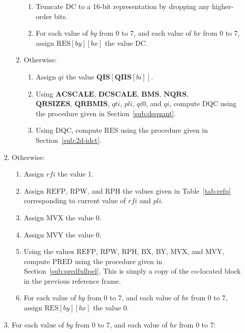 \documentclass[9pt,letterpaper]{book}
\newcommand{\idx}[1]{{\ensuremath{\mathit{#1}}}}
\newcommand{\qti}{\idx{qti}}
\newcommand{\pli}{\idx{pli}}
\newcommand{\qi}{\idx{qi}}
\newcommand{\bi}{\idx{bi}}
\newcommand{\rfi}{\idx{rfi}}
\newcommand{\bitvar}[1]{\ensuremath{\mathbf{\bm{#1}}}}
\newcommand{\locvar}[1]{\ensuremath{\mathrm{#1}}}
\numberwithin{equation}{chapter}
\numberwithin{figure}{chapter}
\numberwithin{table}{chapter}
\begin{document}
\begin{enumerate}
\begin{enumerate}
\begin{enumerate}
\begin{enumerate}
\item
Truncate \locvar{DC} to a 16-bit representation by dropping any higher-order
 bits.
\item
For each value of \locvar{\idx{by}} from 0 to 7, and each value of
 \locvar{\idx{bx}} from 0 to 7, assign
 $\locvar{RES}[\locvar{\idx{by}}][\locvar{\idx{bx}}]$ the value \locvar{DC}.
\end{enumerate}
\item
Otherwise:
\begin{enumerate}
\item
Assign \locvar{\qi} the value $\bitvar{QIS}[\bitvar{QIIS}[\locvar{\bi}]]$.
\item
Using \bitvar{ACSCALE}, \bitvar{DCSCALE}, \bitvar{BMS}, \bitvar{NQRS}, \\
 \bitvar{QRSIZES}, \bitvar{QRBMIS}, \locvar{\qti}, \locvar{\pli},
 \locvar{\idx{qi0}}, and \locvar{\qi}, compute \locvar{DQC} using the procedure
 given in Section~\ref{sub:dequant}.
\item
Using \locvar{DQC}, compute \locvar{RES} using the procedure given in
 Section~\ref{sub:2d-idct}.
\end{enumerate}
\end{enumerate}
\item
Otherwise:
\begin{enumerate}
\item
Assign \locvar{\rfi} the value 1.
\item
Assign \locvar{REFP}, \locvar{RPW}, and \locvar{RPH} the values given in
 Table~\ref{tab:refp} corresponding to current value of \locvar{\rfi} and
 \locvar{\pli}.
\item
Assign \locvar{MVX} the value 0.
\item
Assign \locvar{MVY} the value 0.
\item
Using the values \locvar{REFP}, \locvar{RPW}, \locvar{RPH}, \locvar{BX},
 \locvar{BY}, \locvar{MVX}, and \locvar{MVY}, compute \locvar{PRED} using the
 procedure given in Section~\ref{sub:predfullpel}.
This is simply a copy of the co-located block in the previous reference frame.
\item
For each value of \locvar{\idx{by}} from 0 to 7, and each value of
 \locvar{\idx{bx}} from 0 to 7, assign
 $\locvar{RES}[\locvar{\idx{by}}][\locvar{\idx{bx}}]$ the value 0.
\end{enumerate}
\item
For each value of \locvar{\idx{by}} from 0 to 7, and each value of
 \locvar{\idx{bx}} from 0 to 7:
\begin{enumerate}

\end{enumerate}
\end{enumerate}
\end{enumerate}
\end{document}
